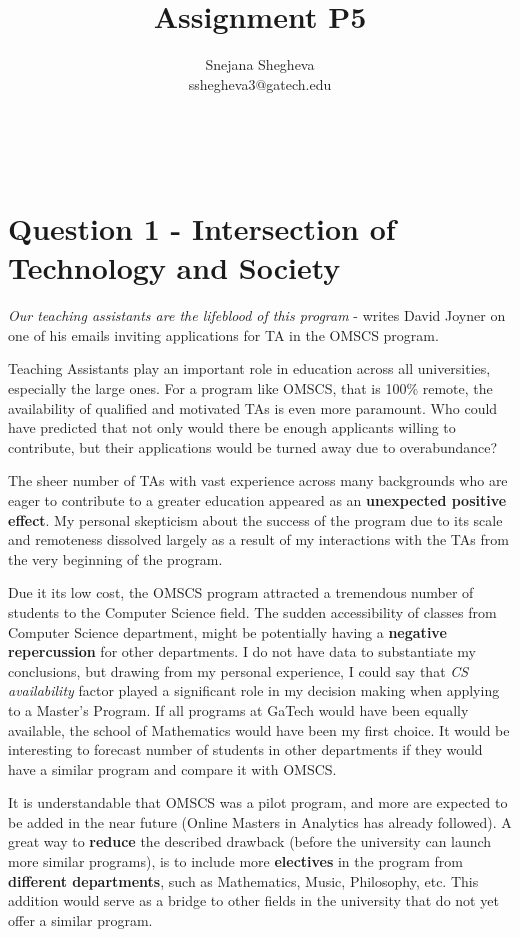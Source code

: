 \documentclass[12pt,letterpaper]{article}
\makeatletter
\renewcommand{\maketitle}{\bgroup
   \begin{center}
   \textbf{{\fontsize{18pt}{20}\selectfont \@title}}\\
   \vspace{10pt}
   {\fontsize{12pt}{0}\selectfont \@author} 
   \end{center}
}
\makeatother
\begin{document}
\title{Assignment P5}
\author{Snejana Shegheva \\ sshegheva3@gatech.edu}

\maketitle
\thispagestyle{fancy}

\section*{Question 1 - Intersection of Technology and Society}

\textit{Our teaching assistants are the lifeblood of this program} - writes David Joyner on one of his emails inviting applications for TA in the OMSCS program. 

Teaching Assistants play an important role in education across all universities, especially the large ones. For a program like OMSCS, that is 100\% remote, the availability of qualified and motivated TAs is even more paramount. Who could have predicted that not only would there be enough applicants willing to contribute, but their applications would be turned away due to overabundance?

The sheer number of TAs with vast experience across many backgrounds who are eager to contribute to a greater education appeared as an \textbf{unexpected positive effect}. My personal skepticism about the success of the program due to its scale and remoteness dissolved largely as a result of my interactions with the TAs from the very beginning of the program. 

Due it its low cost, the OMSCS program attracted a tremendous number of students to the Computer Science field. The sudden accessibility of classes from Computer Science department, might be potentially having a \textbf{negative repercussion} for other departments. I do not have data to substantiate my conclusions, but drawing from my personal experience, I could say that \textit{CS availability} factor played a significant role in my decision making when applying to a Master's Program. If all programs at GaTech would have been equally available, the school of Mathematics would have been my first choice. It would be interesting to forecast number of students in other departments if they would have a similar program and compare it with OMSCS.  

It is understandable that OMSCS was a pilot program, and more are expected to be added in the near future (Online Masters in Analytics has already followed). A great way to \textbf{reduce} the described drawback (before the university can launch more similar programs), is to include more \textbf{electives} in the program from \textbf{different departments}, such as Mathematics, Music, Philosophy, etc. This addition would serve as a bridge to other fields in the university that do not yet offer a similar program. 
\end{document}
